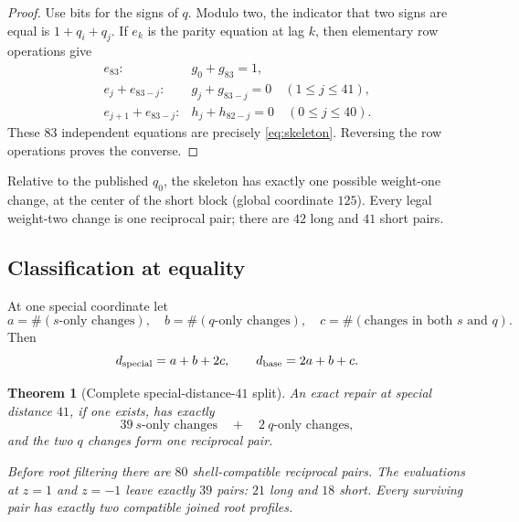 \documentclass[11pt]{article}
\newtheorem{theorem}{Theorem}[section]
\theoremstyle{remark}
\begin{document}
\begin{proof}
Use bits for the signs of $q$.  Modulo two, the indicator that two signs
are equal is $1+q_i+q_j$.  If $e_k$ is the parity equation at lag $k$,
then elementary row operations give
\[
\begin{array}{ll}
 e_{83}:&g_0+g_{83}=1,\\
 e_j+e_{83-j}:&g_j+g_{83-j}=0\quad(1\leq j\leq41),\\
 e_{j+1}+e_{83-j}:&h_j+h_{82-j}=0\quad(0\leq j\leq40).
\end{array}
\]
These $83$ independent equations are precisely \eqref{eq:skeleton}.
Reversing the row operations proves the converse.
\end{proof}

Relative to the published $q_0$, the skeleton has exactly one possible
weight-one change, at the center of the short block (global coordinate
$125$).  Every legal weight-two change is one reciprocal pair; there are
$42$ long and $41$ short pairs.

\subsection{Classification at equality}

At one special coordinate let
\[
 a=\#(s\text{-only changes}),\quad
 b=\#(q\text{-only changes}),\quad
 c=\#(\text{changes in both }s\text{ and }q).
\]
Then
\[
 d_{\rm special}=a+b+2c,\qquad
 d_{\rm base}=2a+b+c.                                \label{eq:costs}
\]

\begin{theorem}[Complete special-distance-$41$ split]
\label{thm:boundary}
An exact repair at special distance $41$, if one exists, has exactly
\[
 39\ s\text{-only changes}
 \quad+\quad
 2\ q\text{-only changes},
                                                        \label{eq:only-boundary}
\]
and the two $q$ changes form one reciprocal pair.

Before root filtering there are $80$ shell-compatible reciprocal pairs.
The evaluations at $z=1$ and $z=-1$ leave exactly $39$ pairs:
$21$ long and $18$ short.  Every surviving pair has exactly two compatible
joined root profiles.
\end{theorem}
\end{document}
